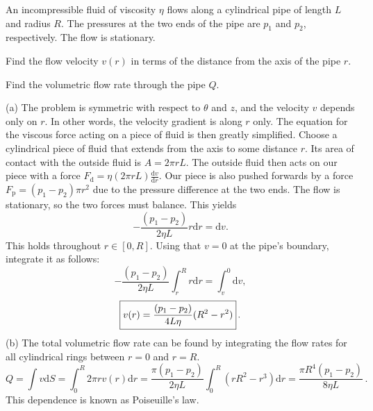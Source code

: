 \documentclass[../TST.tex]{subfiles}
\begin{document}
\begin{pproblem}
An incompressible fluid of viscosity $\eta$ flows along a cylindrical pipe of length $L$ and radius $R$. The pressures at the two ends of the pipe are $p_1$ and $p_2$, respectively. The flow is stationary.
\begin{subpart}
\item Find the flow velocity $v(r)$ in terms of the distance from the axis of the pipe $r$.
\item Find the volumetric flow rate through the pipe $Q$. 
\end{subpart}
\end{pproblem}

\ifprob \else
\begin{solution}
 (a) The problem is symmetric with respect to $\theta$ and $z$, and the velocity $v$ depends only on $r$. In other words, the velocity gradient is along $r$ only. The equation for the viscous force acting on a piece of fluid is then greatly simplified. Choose a cylindrical piece of fluid that extends from the axis to some distance $r$. Its area of contact with the outside fluid is $A=2\pi r L$. The outside fluid then acts on our piece with a force $F_\mathrm{d}=\eta(2\pi rL)\frac{\mathrm{d}v}{\mathrm{d}r}$. Our piece is also pushed forwards by a force $F_\mathrm{p}=(p_1-p_2)\pi r^2$ due to the pressure difference at the two ends. The flow is stationary, so the two forces must balance. This yields
\begin{equation*}
-\frac{(p_1-p_2)}{2\eta L}r \mathrm{d}r = \mathrm{d}v 
.
\end{equation*}
This holds throughout $r\in[0, R]$. Using that $v=0$ at the pipe's boundary, integrate it as follows:
\begin{equation*}
-\frac{(p_1-p_2)}{2\eta L}\int_r^R r \mathrm{d}r = \int_v^0 \mathrm{d}v 
,
\end{equation*}
\begin{equation*}
	\boxed{v(r)=\frac{(p_1-p_2)}{4L\eta}(R^2-r^2)}\, .\\[2ex]
\end{equation*}
(b) The total volumetric flow rate can be found by integrating the flow rates for all cylindrical rings between $r=0$ and $r=R$.
\begin{equation*}
	Q=\int v \mathrm{d}S = \int_0^R 2\pi r v(r)\mathrm{d}r = \frac{\pi(p_1-p_2)}{2\eta L}\int_0^R(rR^2-r^3)\mathrm{d}r= \boxed{\frac{\pi R^4 (p_1-p_2)}{8\eta L}}\,
.
\end{equation*}
This dependence is known as Poiseuille's law.\\
\end{solution}
\fi
\end{document}
